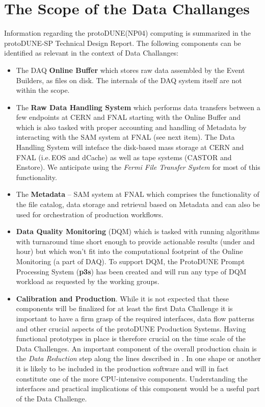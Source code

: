 \documentclass[pdftex,12pt,letter]{article}
\newcommand{\pd}{protoDUNE\xspace}
\begin{document}
\section{The Scope of the Data Challanges}
Information regarding the \pd (NP04) computing is summarized in the \pd-SP Technical Design Report\cite{docdb1794}.
The following components can be identified as relevant in the context of Data Challanges:
\begin{itemize}
\item The DAQ \textbf{Online Buffer} which stores raw data assembled by the Event Builders, as files on disk. The internals
of the DAQ system itself are not within the scope.

\item The \textbf{Raw Data Handling System}\cite{docdb1212}  which performs data transfers between a few endpoints
at CERN and FNAL starting with the Online Buffer and which is also tasked with proper accounting and handling of Metadata
by interacting with the SAM system at FNAL (see next item). The Data Handling System will inteface the disk-based mass storage
at CERN and FNAL (i.e.\,EOS and dCache) as well as tape systems (CASTOR and Enstore). We anticipate using the \textit{Fermi
File Transfer System}\cite{fts} for most of this functionality.

\item The \textbf{Metadata}  -- SAM system at FNAL which comprises the functionality of the file catalog, data storage and
retrieval based on Metadata and can also be used for orchestration of production workflows.

\item \textbf{Data Quality Monitoring} (DQM) which is tasked with running algorithms with turnaround time short enough to provide
actionable results (under and hour) but which won't fit into the computational footprint of the Online Monitoring (a part of DAQ).
To support DQM, the ProtoDUNE Prompt Processing System (\textbf{p3s}) has been created and will run any type of DQM workload
as requested by the working groups.

\item \textbf{Calibration and Production}. While it is not expected that these components will be finalized for at least the first Data
Challenge it is important to have a firm grasp of the required interfaces, data flow patterns and other crucial aspects of
the \pd Production Systems. Having functional prototypes in place is therefore crucial on the time scale of the Data Challenges.
An important component of the overall production chain is the \textit{Data Reduction} step along the lines described
in \cite{docdb2089}. In one shape or another it is likely to be included in the production software and will in fact constitute
one of the more CPU-intensive components. Understanding the interfaces and practical implications of this component would
be a useful part of the Data Challenge.


\end{itemize}
\end{document}
